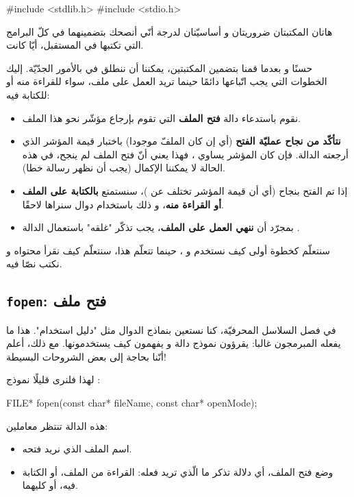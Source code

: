 \begin{Csource}
#include <stdlib.h>
#include <stdio.h>
\end{Csource}

هاتان المكتبتان ضروريتان و أساسيّتان لدرجة أنّي أنصحك بتضمينهما في كلّ البرامج التي تكتبها في المستقبل، أيّا كانت.

حسنًا و بعدما قمنا بتضمين المكتبتين، يمكننا أن ننطلق في بالأمور الجدّيّة. إليك الخطوات التي يجب اتّباعها دائمًا حينما تريد العمل على ملف، سواء للقراءة منه أو للكتابة فيه:

\begin{itemize}
  \item نقوم باستدعاء دالة
\textbf{فتح الملف}
التي تقوم بإرجاع مؤشّر نحو هذا الملف.
  \item \textbf{نتأكّد من نجاح عمليّة الفتح}
(أي إن كان الملفّ موجودا) باختبار قيمة المؤشر الذي أرجعته الدالة. فإن كان المؤشر يساوي
،
فهذا يعني أنّ فتح الملف لم ينجح، في هذه الحالة لا يمكننا الإكمال (يجب أن نظهر رسالة خطا).
  \item إذا تم الفتح بنجاح (أي أن قيمة المؤشر تختلف عن
)،
سنستمتع
\textbf{بالكتابة على الملف أو القراءة منه}،
و ذلك باستخدام دوال سنراها لاحقًا.
  \item بمجرّد أن
\textbf{ننهي العمل على الملف}،
يجب تذكّر "غلقه" باستعمال الدالة
.
\end{itemize}

سنتعلّم كخطوة أولى كيف نستخدم
و
،
حينما تتعلّم هذا، سنتعلّم كيف نقرأ محتواه و نكتب نصّا فيه.

\subsection{\texttt{fopen}: فتح ملف}

في فصل السلاسل المحرفيّة، كنا نستعين بنماذج الدوال مثل "دليل استخدام". هذا ما يفعله المبرمجون غالبا: يقرؤون نموذج دالة و يفهمون كيف يستخدمونها. مع ذلك، أعلم أنّنا بحاجة إلى بعض الشروحات البسيطة!

لهذا فلنرى قليلًا نموذج
:

\begin{Csource}
FILE* fopen(const char* fileName, const char* openMode);
\end{Csource}

هذه الدالة تنتظر معاملين:

\begin{itemize}
  \item اسم الملف الذي نريد فتحه.
  \item وضع فتح الملف، أي دلالة تذكر ما الّذي تريد فعله: القراءة من الملف، أو الكتابة فيه، أو كليهما.
\end{itemize}

